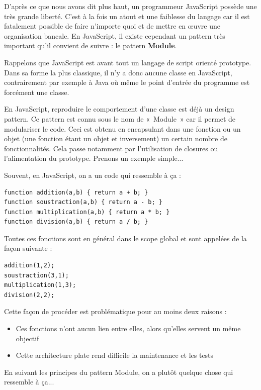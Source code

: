 \documentclass[a4paper,12pt]{article}
\begin{document}
D'après ce que nous avons dit plus haut, un programmeur JavaScript possède une très grande liberté. C'est à la fois un atout et une faiblesse du langage car il est fatalement possible de faire n'importe quoi et de mettre en œuvre une organisation bancale. En JavaScript, il existe cependant un pattern très important qu'il convient de suivre : le pattern \textbf{Module}.

Rappelons que JavaScript est avant tout un langage de script orienté prototype. Dans sa forme la plus classique, il n'y a donc aucune classe en JavaScript, contrairement par exemple à Java où même le point d'entrée du programme est forcément une classe.

En JavaScript, reproduire le comportement d'une classe est déjà un design pattern. Ce pattern est connu sous le nom de «~Module~» car il permet de modulariser le code. Ceci est obtenu en encapsulant dans une fonction ou un objet (une fonction étant un objet et inversement) un certain nombre de fonctionnalités. Cela passe notamment par l'utilisation de closures ou l'alimentation du prototype. Prenons un exemple simple...

Souvent, en JavaScript, on a un code qui ressemble à ça :

\begin{lstlisting}
function addition(a,b) { return a + b; }
function soustraction(a,b) { return a - b; }
function multiplication(a,b) { return a * b; }
function division(a,b) { return a / b; }
\end{lstlisting}

Toutes ces fonctions sont en général dans le scope global et sont appelées de la façon suivante :

\begin{lstlisting}
addition(1,2);
soustraction(3,1);
multiplication(1,3);
division(2,2);
\end{lstlisting}

Cette façon de procéder est problématique pour au moins deux raisons :

\begin{itemize}
 \item{Ces fonctions n'ont aucun lien entre elles, alors qu'elles servent un même objectif}
 \item{Cette architecture plate rend difficile la maintenance et les tests}
\end{itemize}

En suivant les principes du pattern Module, on a plutôt quelque chose qui ressemble à ça...
\end{document}
